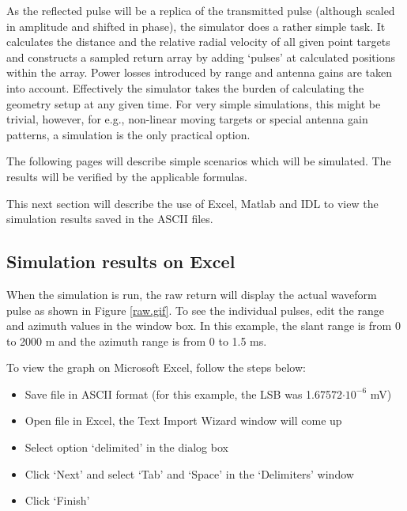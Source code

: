 \documentclass[thmsa,a4paper,ukenglish]{report}
\begin{document}
As the reflected pulse will be a replica of the transmitted pulse (although
scaled in amplitude and shifted in phase), the simulator does a rather
simple task. It calculates the distance and the relative radial velocity of
all given point targets and constructs a sampled return array by adding
`pulses' at calculated positions within the array. Power losses introduced
by range and antenna gains are taken into account. Effectively the simulator
takes the burden of calculating the geometry setup at any given time. For
very simple simulations, this might be trivial, however, for e.g.,
non-linear moving targets or special antenna gain patterns, a simulation is
the only practical option.

The following pages will describe simple scenarios which will be simulated.
The results will be verified by the applicable formulas.

\smallskip

\smallskip This next section will describe the use of Excel, Matlab and IDL
to view the simulation results saved in the ASCII files.

\subsection{\protect\smallskip Simulation results on Excel}

When the simulation is run, the raw return will display the actual waveform
pulse as shown in Figure \ref{raw.gif}. To see the individual pulses, edit
the range and azimuth values in the window box. In this example, the slant
range is from 0 to 2000 m and the azimuth range is from 0 to 1.5 ms.

\smallskip To view the graph on Microsoft Excel, follow the steps below:

\begin{itemize}
\begin{itemize}
\item  Save file in ASCII format (for this example, the LSB was 1.67572$%
\cdot 10^{-6}$ mV)

\item  Open file in Excel, the Text Import Wizard window will come up

\item  Select option `delimited' in the dialog box

\item  Click `Next' and select `Tab' and `Space' in the `Delimiters' window

\item  Click `Finish'
\end{itemize}
\end{itemize}
\end{document}
